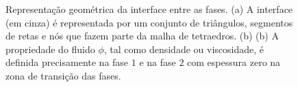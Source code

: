 \documentclass[a4paper,portuges]{article}
\begin{document}
\begin{figure}[ht!]
	\caption{Representação geométrica da interface entre as fases. (a) A
	interface (em cinza) é representada por um conjunto de triângulos,
	segmentos de retas e nós que fazem parte da malha de tetraedros. (b)
	(b) A propriedade do fluido $\phi$, tal como densidade ou
	viscosidade, é definida precisamente na fase $1$ e na fase $2$ com 
	espessura zero na zona de transição das fases.}
	\label{fig:inter} 
\end{figure}
\end{document}
